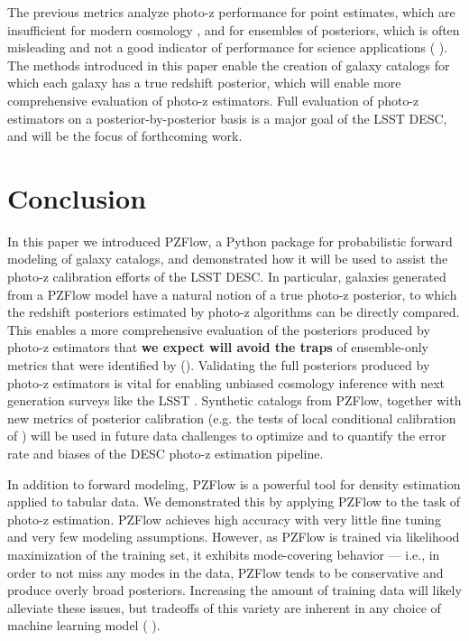\documentclass[twocolumn,twocolappendix]{aastex631}
\newcommand{\citePZp}{(\citetalias{schmidt2020} \citeyear{schmidt2020})\xspace}
\newcommand{\citePZt}{\citetalias{schmidt2020} (\citeyear{schmidt2020})\xspace}
\begin{document}
The previous metrics analyze photo-z performance for point estimates, which are insufficient for modern cosmology \citep{newman2022}, and for ensembles of posteriors, which is often misleading and not a good indicator of performance for science applications \citePZp.
The methods introduced in this paper enable the creation of galaxy catalogs for which each galaxy has a true redshift posterior, which will enable more comprehensive evaluation of photo-z estimators.
Full evaluation of photo-z estimators on a posterior-by-posterior basis is a major goal of the LSST DESC, and will be the focus of forthcoming work.


\section{Conclusion}
\label{sec:conclusion}

In this paper we introduced PZFlow, a Python package for probabilistic forward modeling of galaxy catalogs, and demonstrated how it will be used to assist the photo-z calibration efforts of the LSST DESC.
In particular, galaxies generated from a PZFlow model have a natural notion of a true photo-z posterior, to which the redshift posteriors estimated by photo-z algorithms can be directly compared.
This enables a more comprehensive evaluation of the posteriors produced by photo-z estimators that \textbf{we expect will avoid the traps} of ensemble-only metrics that were identified by \citePZt.
Validating the full posteriors produced by photo-z estimators is vital for enabling unbiased cosmology inference with next generation surveys like the LSST \citep{newman2022}.
Synthetic catalogs from PZFlow, together with new metrics of posterior calibration (e.g. the tests of local conditional calibration of \citealt{dey2021b, dey2022}) will be used in future data challenges to optimize and to quantify the error rate and biases of the DESC photo-z estimation pipeline.

In addition to forward modeling, PZFlow is a powerful tool for density estimation applied to tabular data.
We demonstrated this by applying PZFlow to the task of photo-z estimation.
PZFlow achieves high accuracy with very little fine tuning and very few modeling assumptions.
However, as PZFlow is trained via likelihood maximization of the training set, it exhibits mode-covering behavior --- i.e., in order to not miss any modes in the data, PZFlow tends to be conservative and produce overly broad posteriors.
Increasing the amount of training data will likely alleviate these issues, but tradeoffs of this variety are inherent in any choice of machine learning model \citePZp.
\end{document}
